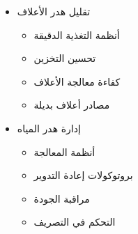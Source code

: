 \begin{itemize}
\begin{itemize}
        \item تقليل هدر الأعلاف
        \begin{itemize}
            \item أنظمة التغذية الدقيقة
            \item تحسين التخزين
            \item كفاءة معالجة الأعلاف
            \item مصادر أعلاف بديلة
        \end{itemize}
        
        \item إدارة هدر المياه
        \begin{itemize}
            \item أنظمة المعالجة
            \item بروتوكولات إعادة التدوير
            \item مراقبة الجودة
            \item التحكم في التصريف
        \end{itemize}
    \end{itemize}
\end{itemize}

